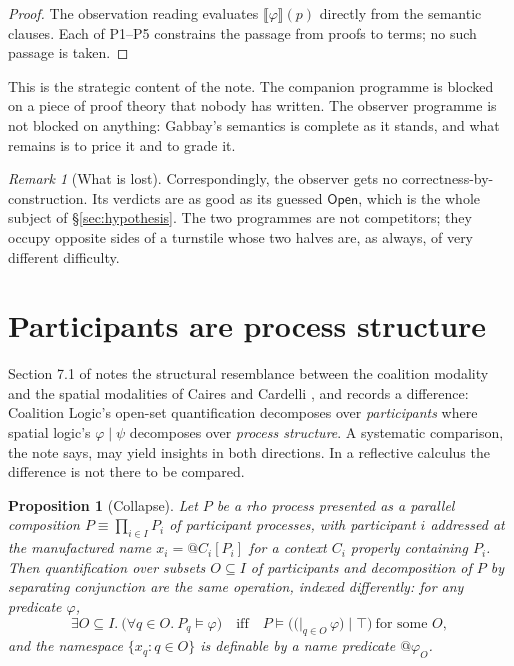 \documentclass[11pt,a4paper]{article}
\makeatletter
\theoremstyle{plain}
\newtheorem{proposition}[theorem]{Proposition}
\theoremstyle{definition}
\theoremstyle{remark}
\newtheorem{remark}[theorem]{Remark}
\newcommand{\Open}{\mathsf{Open}}
\newcommand{\sem}[1]{\llbracket #1 \rrbracket}
\newcommand{\qq}[1]{@#1}
\makeatother
\begin{document}
\begin{proof}
The observation reading evaluates $\sem{\varphi}(p)$ directly from the
semantic clauses. Each of P1--P5 constrains the passage from proofs to terms;
no such passage is taken.
\end{proof}

This is the strategic content of the note. The companion programme is blocked
on a piece of proof theory that nobody has written. The observer programme is
not blocked on anything: Gabbay's semantics is complete as it stands, and what
remains is to price it and to grade it.

\begin{remark}[What is lost]
Correspondingly, the observer gets no correctness-by-construction. Its verdicts
are as good as its guessed $\Open$, which is the whole subject of
\S\ref{sec:hypothesis}. The two programmes are not competitors; they occupy
opposite sides of a turnstile whose two halves are, as always, of very
different difficulty.
\end{remark}

\section{Participants are process structure}\label{sec:collapse}

Section 7.1 of \cite{consensus} notes the structural resemblance between the
coalition modality and the spatial modalities of Caires and Cardelli
\cite{CC01,CC04}, and records a difference:
Coalition Logic's open-set quantification decomposes over \emph{participants}
where spatial logic's $\varphi\mid\psi$ decomposes over \emph{process
structure}. A systematic comparison, the note says, may yield insights in both
directions. In a reflective calculus the difference is not there to be
compared.

\begin{proposition}[Collapse]\label{prop:collapse}
Let $P$ be a rho process presented as a parallel composition
$P \equiv \prod_{i\in I} P_i$ of participant processes, with participant $i$
addressed at the manufactured name $x_i = \qq{C_i[P_i]}$ for a context $C_i$
properly containing $P_i$. Then quantification over subsets $O\subseteq I$ of
participants and decomposition of $P$ by separating conjunction are the same
operation, indexed differently: for any predicate $\varphi$,
\[
\exists O\subseteq I.\ \big(\forall q\in O.\ P_q\models\varphi\big)
\quad\text{iff}\quad
P \models \Big(\big(\textstyle\big|_{q\in O}\,\varphi\big) \mid \top\Big)
\ \text{for some } O ,
\]
and the namespace $\{x_q : q\in O\}$ is definable by a name predicate
$\qq{\varphi_O}$.
\end{proposition}
\end{document}
